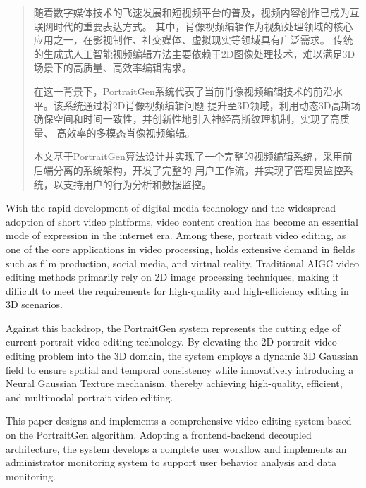 

\begin{abstract}
  随着数字媒体技术的飞速发展和短视频平台的普及，视频内容创作已成为互联网时代的重要表达方式。
  其中，肖像视频编辑作为视频处理领域的核心应用之一，在影视制作、社交媒体、虚拟现实等领域具有广泛需求。
  传统的生成式人工智能视频编辑方法主要依赖于2D图像处理技术，难以满足3D场景下的高质量、高效率编辑需求。

  在这一背景下，PortraitGen系统代表了当前肖像视频编辑技术的前沿水平。该系统通过将2D肖像视频编辑问题
  提升至3D领域，利用动态3D高斯场确保空间和时间一致性，并创新性地引入神经高斯纹理机制，实现了高质量、
  高效率的多模态肖像视频编辑。
  
  本文基于PortraitGen算法设计并实现了一个完整的视频编辑系统，采用前后端分离的系统架构，开发了完整的
  用户工作流，并实现了管理员监控系统，以支持用户的行为分析和数据监控。

\end{abstract}

\begin{abstract*}
  With the rapid development of digital media technology and the widespread adoption of short 
  video platforms, video content creation has become an essential mode of expression in the 
  internet era. Among these, portrait video editing, as one of the core applications in video 
  processing, holds extensive demand in fields such as film production, social media, and virtual 
  reality. Traditional AIGC video editing methods primarily rely on 2D image 
  processing techniques, making it difficult to meet the requirements for high-quality and 
  high-efficiency editing in 3D scenarios.

  Against this backdrop, the PortraitGen system represents the cutting edge of current portrait 
  video editing technology. By elevating the 2D portrait video editing problem into the 3D domain, 
  the system employs a dynamic 3D Gaussian field to ensure spatial and temporal consistency while 
  innovatively introducing a Neural Gaussian Texture mechanism, thereby achieving high-quality, 
  efficient, and multimodal portrait video editing.

  This paper designs and implements a comprehensive video editing system based on the PortraitGen 
  algorithm. Adopting a frontend-backend decoupled architecture, the system develops a complete 
  user workflow and implements an administrator monitoring system to support user behavior 
  analysis and data monitoring.
\end{abstract*}
